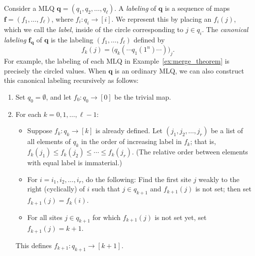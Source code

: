 \documentclass[reqno]{amsart}
\newcommand{\0}{\phantom{c}}
\newcommand{\ff}{\mathbf{f}}
\newcommand{\qq}{\mathbf{q}}
\newcommand{\tup}[1]{\left( #1 \right)}
\newcommand{\ive}[1]{\left[ #1 \right]}
\newcommand{\defn}[1]{{\color{darkred}\emph{#1}}} %
\theoremstyle{plain}
\theoremstyle{definition}
\numberwithin{equation}{section}
\begin{document}
Consider a MLQ $\qq = (q_1, q_2, \dotsc, q_{\ell})$.
A \defn{labeling} of $\qq$ is a sequence of maps $\ff = (f_1, \dotsc, f_{\ell})$, where $f_i \colon q_i \to \ive{i}$.
We represent this by placing an $f_i(j)$, which we call the \defn{label}, inside of the circle corresponding to $j \in q_i$.
The \defn{canonical labeling} $\ff_{\qq}$ of $\qq$ is the labeling $(f_1, \dotsc, f_{\ell})$ defined by
\begin{equation}
f_k(j) = \bigl( q_k( \cdots q_1(1^n) \cdots ) \bigr)_j.
\label{eq.AasLin-lab.formula}
\end{equation}
For example, the labeling of each MLQ in Example~\ref{ex:merge_theorem} is precisely the circled values.
When $\qq$ is an ordinary MLQ, we can also construct this canonical labeling recursively as follows:
\begin{enumerate}
\item Set $q_0 = \emptyset$, and let $f_0 : q_0 \to \ive{0}$ be the trivial map.
\item For each $k = 0, 1, \ldots, \ell-1$:
\begin{itemize}
\item Suppose $f_k \colon q_k \to \ive{k}$ is already defined. Let $\tup{j_1, j_2, \ldots, j_r}$ be a list of all elements of $q_k$ in the order of increasing label in $f_k$; that is, $f_k(j_1) \leq f_k(j_2) \leq \cdots \leq f_k(j_r)$.
      (The relative order between elements with equal label is immaterial.)
\item For $i = i_1, i_2, \ldots, i_r$, do the following:
      Find the first site $j$ weakly to the right (cyclically) of $i$ such that $j \in q_{k+1}$ and $f_{k+1}(j)$ is not set; then set $f_{k+1}(j) = f_k(i)$.
\item For all sites $j \in q_{k+1}$ for which $f_{k+1}(j)$ is not set yet, set $f_{k+1}(j) = k+1$.
\end{itemize}
This defines $f_{k+1} \colon q_{k+1} \to \ive{k+1}$.
\end{enumerate}
\end{document}
